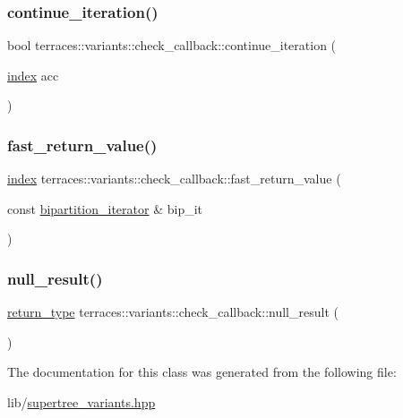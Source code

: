 \subsubsection{\texorpdfstring{continue\+\_\+iteration()}{continue\_iteration()}}
{\footnotesize\ttfamily bool terraces\+::variants\+::check\+\_\+callback\+::continue\+\_\+iteration (\begin{DoxyParamCaption}\item[{\hyperlink{namespaceterraces_adbc33ccb543d1634e96d0eb02e472c77}{index}}]{acc }\end{DoxyParamCaption})\hspace{0.3cm}{\ttfamily [inline]}}

\mbox{\label{classterraces_1_1variants_1_1check__callback_ab1f6178238da189f90730d6c78861fa9}} 
\subsubsection{\texorpdfstring{fast\+\_\+return\+\_\+value()}{fast\_return\_value()}}
{\footnotesize\ttfamily \hyperlink{namespaceterraces_adbc33ccb543d1634e96d0eb02e472c77}{index} terraces\+::variants\+::check\+\_\+callback\+::fast\+\_\+return\+\_\+value (\begin{DoxyParamCaption}\item[{const \hyperlink{classterraces_1_1bipartition__iterator}{bipartition\+\_\+iterator} \&}]{bip\+\_\+it }\end{DoxyParamCaption})\hspace{0.3cm}{\ttfamily [inline]}}

\mbox{\label{classterraces_1_1variants_1_1check__callback_ab1be85a2995d71794d514be07408005a}} 
\subsubsection{\texorpdfstring{null\+\_\+result()}{null\_result()}}
{\footnotesize\ttfamily \hyperlink{classterraces_1_1variants_1_1check__callback_ab5d02c5889d54c20a3e74d104aab9893}{return\+\_\+type} terraces\+::variants\+::check\+\_\+callback\+::null\+\_\+result (\begin{DoxyParamCaption}{ }\end{DoxyParamCaption})\hspace{0.3cm}{\ttfamily [inline]}}



The documentation for this class was generated from the following file\+:\begin{DoxyCompactItemize}
\item 
lib/\hyperlink{supertree__variants_8hpp}{supertree\+\_\+variants.\+hpp}\end{DoxyCompactItemize}
